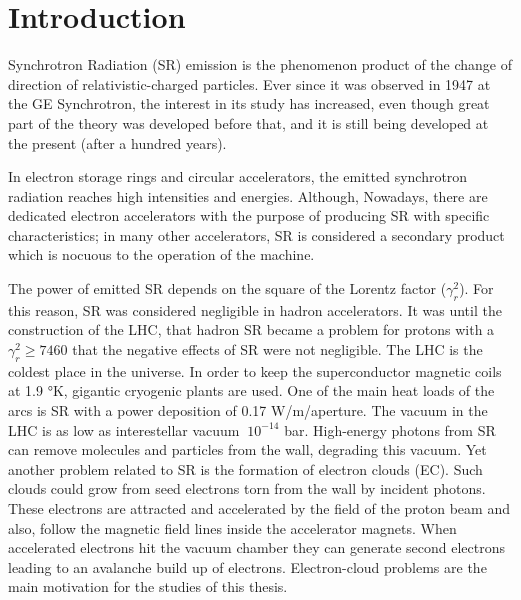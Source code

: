 
\chapter{Introduction} %

\label{intro} %



Synchrotron Radiation (SR) emission is the phenomenon
product of the change of direction of relativistic-charged particles.  Ever
since it was observed in 1947 at the GE Synchrotron,  the
interest in its study has increased, even though great part of the theory was
developed before that, and it is still being developed at the present (after a
hundred years).

In electron storage rings and circular accelerators, the emitted synchrotron
radiation reaches high intensities and energies. Although, Nowadays, there are
dedicated electron accelerators with the purpose of producing SR with specific
characteristics; in many other accelerators, SR is considered a secondary
product which is nocuous to the operation of the machine.

The power of emitted SR  depends on the square of the Lorentz factor
(\(\gamma_r^{2}\)). For this reason, SR was considered negligible in hadron
accelerators. It was until the construction of the  LHC, that hadron SR became a
problem for protons with a \(\gamma_r^{2}\geq 7460\) that the negative effects
of SR were not negligible. The LHC is the coldest place in the universe. In
order to keep the superconductor magnetic coils at 1.9 °K, gigantic cryogenic
plants are used. One of the main heat loads of the arcs is SR with a power
deposition of 0.17 W/m/aperture. The vacuum in the LHC is as low as
interestellar vacuum \(~10^{-14}\) bar. High-energy photons from SR can remove
molecules and particles from the wall, degrading this vacuum.  Yet another
problem related to SR is the formation of electron clouds (EC). Such clouds could
grow from seed electrons torn from the wall by incident photons. These electrons
are attracted and accelerated by the field of the proton beam and also, follow
the magnetic field lines inside the accelerator magnets. When accelerated
electrons hit the vacuum chamber they can generate second electrons leading to
an avalanche build up of electrons. Electron-cloud problems are the main
motivation for the studies of this thesis.


